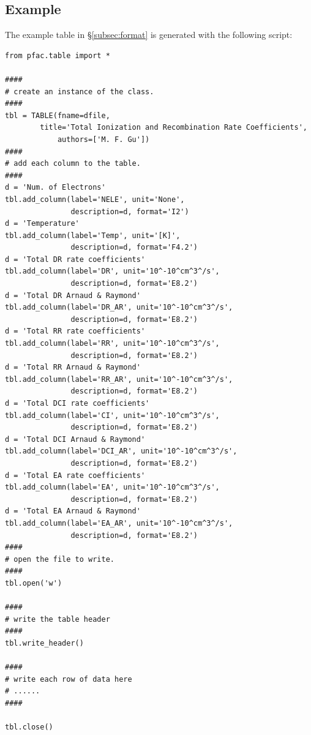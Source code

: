 \documentclass[twoside,letterpaper]{refrep}
\begin{document}
\subsection{Example}
The example table in \S\ref{subsec:format} is generated with the following
script:
\begin{verbatim}
from pfac.table import *

####
# create an instance of the class.
####
tbl = TABLE(fname=dfile,
	    title='Total Ionization and Recombination Rate Coefficients',
            authors=['M. F. Gu'])
####
# add each column to the table.
####
d = 'Num. of Electrons'
tbl.add_column(label='NELE', unit='None',
               description=d, format='I2')
d = 'Temperature'
tbl.add_column(label='Temp', unit='[K]',
               description=d, format='F4.2')
d = 'Total DR rate coefficients'
tbl.add_column(label='DR', unit='10^-10^cm^3^/s',
               description=d, format='E8.2')
d = 'Total DR Arnaud & Raymond'
tbl.add_column(label='DR_AR', unit='10^-10^cm^3^/s',
               description=d, format='E8.2')
d = 'Total RR rate coefficients'
tbl.add_column(label='RR', unit='10^-10^cm^3^/s',
               description=d, format='E8.2')
d = 'Total RR Arnaud & Raymond'
tbl.add_column(label='RR_AR', unit='10^-10^cm^3^/s',
               description=d, format='E8.2')
d = 'Total DCI rate coefficients'
tbl.add_column(label='CI', unit='10^-10^cm^3^/s',
               description=d, format='E8.2')
d = 'Total DCI Arnaud & Raymond'
tbl.add_column(label='DCI_AR', unit='10^-10^cm^3^/s',
               description=d, format='E8.2')
d = 'Total EA rate coefficients'
tbl.add_column(label='EA', unit='10^-10^cm^3^/s',
               description=d, format='E8.2')
d = 'Total EA Arnaud & Raymond'
tbl.add_column(label='EA_AR', unit='10^-10^cm^3^/s',
               description=d, format='E8.2')
####
# open the file to write.
####
tbl.open('w')

####
# write the table header
####
tbl.write_header()

####
# write each row of data here
# ......
####

tbl.close()

\end{verbatim}
\end{document}
